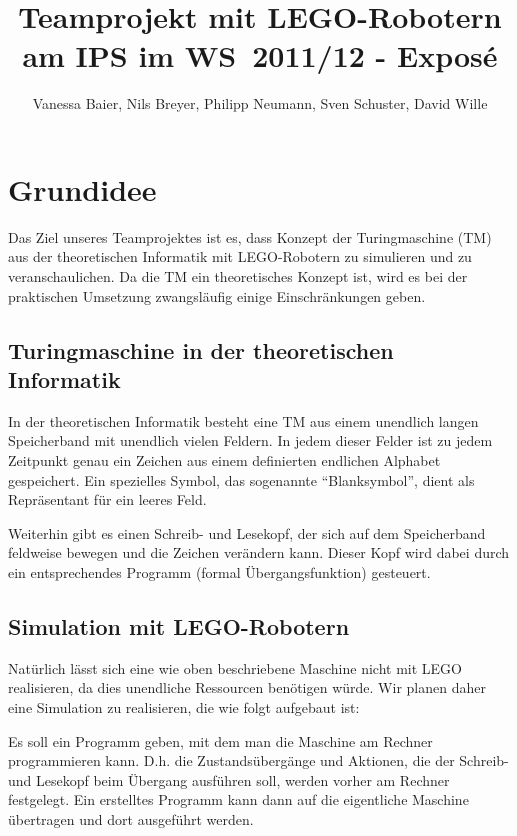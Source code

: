 \documentclass[a4paper,12pt]{article}
\begin{document}
\newcommand{\TODO}[1]{{\bf{TODO: #1}}}

\author{Vanessa Baier, Nils Breyer, Philipp Neumann, Sven Schuster, David Wille}
\title{Teamprojekt mit LEGO-Robotern am IPS im \mbox{WS 2011/12} - Exposé}

\maketitle

\section{Grundidee}

Das Ziel unseres Teamprojektes ist es, dass Konzept der Turingmaschine (TM) aus der theoretischen Informatik mit LEGO-Robotern zu simulieren und zu veranschaulichen. Da die TM ein theoretisches Konzept ist, wird es bei der praktischen Umsetzung zwangsläufig einige Einschränkungen geben.

\subsection{Turingmaschine in der theoretischen Informatik}

In der theoretischen Informatik besteht eine TM aus einem unendlich langen Speicherband mit unendlich vielen Feldern. In jedem dieser Felder ist zu jedem Zeitpunkt genau ein Zeichen aus einem definierten endlichen Alphabet gespeichert. Ein spezielles Symbol, das sogenannte "`Blanksymbol"', dient als Repräsentant für ein leeres Feld.
 
Weiterhin gibt es einen Schreib- und Lesekopf, der sich auf dem Speicherband feldweise bewegen und die Zeichen verändern kann. Dieser Kopf wird dabei durch ein entsprechendes Programm (formal Übergangsfunktion) gesteuert.

\subsection{Simulation mit LEGO-Robotern}

Natürlich lässt sich eine wie oben beschriebene Maschine nicht mit LEGO realisieren, da dies unendliche Ressourcen benötigen würde. Wir planen daher eine Simulation zu realisieren, die wie folgt aufgebaut ist:

Es soll ein Programm geben, mit dem man die Maschine am Rechner programmieren kann. D.h. die Zustandsübergänge und Aktionen, die der Schreib- und Lesekopf beim Übergang ausführen soll, werden vorher am Rechner festgelegt. Ein erstelltes Programm kann dann auf die eigentliche Maschine übertragen und dort ausgeführt werden.
\end{document}
